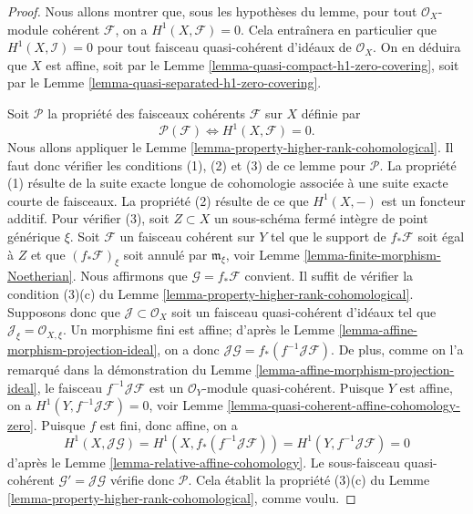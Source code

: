 \begin{proof}
Nous allons montrer que, sous les hypothèses du lemme, pour tout
$\mathcal{O}_X$-module cohérent $\mathcal{F}$, on a $H^1(X, \mathcal{F}) = 0$.
Cela entraînera en particulier que $H^1(X, \mathcal{I}) = 0$
pour tout faisceau quasi-cohérent d'idéaux de $\mathcal{O}_X$. On en
déduira que $X$ est affine, soit par le
Lemme \ref{lemma-quasi-compact-h1-zero-covering}, soit par le
Lemme \ref{lemma-quasi-separated-h1-zero-covering}.

\medskip\noindent
Soit $\mathcal{P}$ la propriété des faisceaux cohérents
$\mathcal{F}$ sur $X$ définie par
$$
\mathcal{P}(\mathcal{F}) \Leftrightarrow H^1(X, \mathcal{F}) = 0.
$$
Nous allons appliquer le Lemme \ref{lemma-property-higher-rank-cohomological}.
Il faut donc vérifier les conditions (1), (2) et (3) de ce lemme pour $\mathcal{P}$.
La propriété (1) résulte de la suite exacte longue de cohomologie associée
à une suite exacte courte de faisceaux. La propriété (2) résulte de ce que
$H^1(X, -)$ est un foncteur additif. Pour vérifier (3), soit $Z \subset X$
un sous-schéma fermé intègre de point générique $\xi$.
Soit $\mathcal{F}$ un faisceau cohérent sur $Y$ tel que
le support de $f_*\mathcal{F}$ soit égal à $Z$
et que $(f_*\mathcal{F})_\xi$ soit annulé par $\mathfrak m_\xi$,
voir Lemme \ref{lemma-finite-morphism-Noetherian}. Nous affirmons que
$\mathcal{G} = f_*\mathcal{F}$ convient. Il suffit de vérifier
la condition (3)(c) du Lemme \ref{lemma-property-higher-rank-cohomological}.
Supposons donc que $\mathcal{J} \subset \mathcal{O}_X$ soit un
faisceau quasi-cohérent d'idéaux tel que
$\mathcal{J}_\xi = \mathcal{O}_{X, \xi}$.
Un morphisme fini est affine; d'après le
Lemme \ref{lemma-affine-morphism-projection-ideal}, on a donc
$\mathcal{J}\mathcal{G} = f_*(f^{-1}\mathcal{J}\mathcal{F})$.
De plus, comme on l'a remarqué dans la démonstration du
Lemme \ref{lemma-affine-morphism-projection-ideal}, le faisceau
$f^{-1}\mathcal{J}\mathcal{F}$ est un $\mathcal{O}_Y$-module quasi-cohérent.
Puisque $Y$ est affine, on a $H^1(Y, f^{-1}\mathcal{J}\mathcal{F}) = 0$,
voir Lemme \ref{lemma-quasi-coherent-affine-cohomology-zero}.
Puisque $f$ est fini, donc affine, on a
$$
H^1(X, \mathcal{J}\mathcal{G}) =
H^1(X, f_*(f^{-1}\mathcal{J}\mathcal{F})) =
H^1(Y, f^{-1}\mathcal{J}\mathcal{F}) = 0
$$
d'après le Lemme \ref{lemma-relative-affine-cohomology}.
Le sous-faisceau quasi-cohérent $\mathcal{G}' = \mathcal{J}\mathcal{G}$
vérifie donc $\mathcal{P}$. Cela établit la propriété (3)(c) du
Lemme \ref{lemma-property-higher-rank-cohomological}, comme voulu.
\end{proof}












